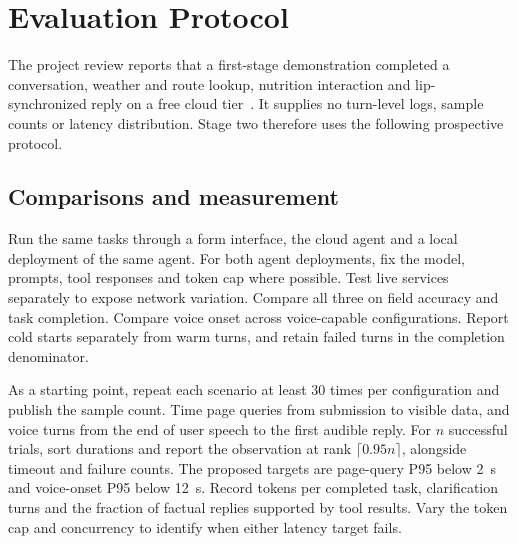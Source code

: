 \documentclass[conference]{IEEEtran}
\begin{document}
\section{Evaluation Protocol}
The project review reports that a first-stage demonstration completed a conversation, weather and route lookup, nutrition interaction and lip-synchronized reply on a free cloud tier~\cite{project}. It supplies no turn-level logs, sample counts or latency distribution. Stage two therefore uses the following prospective protocol.

\subsection{Comparisons and measurement}
Run the same tasks through a form interface, the cloud agent and a local deployment of the same agent. For both agent deployments, fix the model, prompts, tool responses and token cap where possible. Test live services separately to expose network variation. Compare all three on field accuracy and task completion. Compare voice onset across voice-capable configurations. Report cold starts separately from warm turns, and retain failed turns in the completion denominator.

As a starting point, repeat each scenario at least 30 times per configuration and publish the sample count. Time page queries from submission to visible data, and voice turns from the end of user speech to the first audible reply. For $n$ successful trials, sort durations and report the observation at rank $\lceil0.95n\rceil$, alongside timeout and failure counts. The proposed targets are page-query P95 below 2~s and voice-onset P95 below 12~s. Record tokens per completed task, clarification turns and the fraction of factual replies supported by tool results. Vary the token cap and concurrency to identify when either latency target fails.
\end{document}
